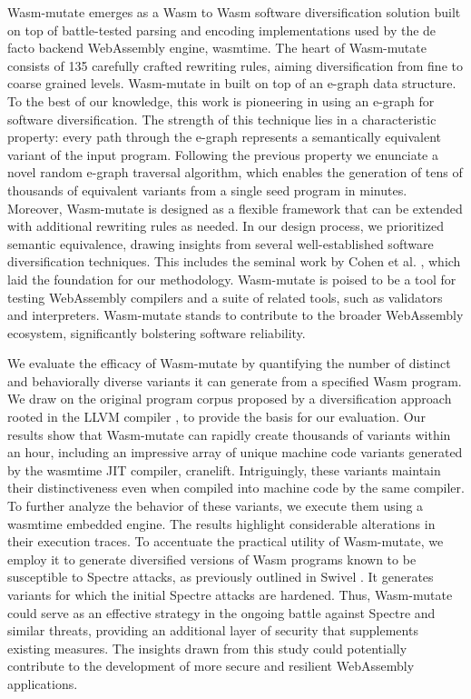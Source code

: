 \documentclass[sigplan,screen]{acmart}
\newcommand*\badge[1]{ \colorbox{red}{\color{white}#1}}
\newcommand{\tool}{Wasm-mutate\xspace}
\newcommand{\wasm}{Wasm\xspace}
\newcommand{\Wasm}{WebAssembly\xspace}
\newcommand{\todo}[1]{%
\refstepcounter{todo}
\noindent\textbf{\badge{TODO}} {\color{red}#1}
\addcontentsline{td}{todo}
{\color{red}\thesection.\thetodo\xspace #1}}
\begin{document}
\tool emerges as a \wasm to \wasm software diversification solution built on top of battle-tested parsing and encoding implementations used by the de facto backend \Wasm engine, wasmtime.
The heart of \tool consists of 135 carefully crafted rewriting rules, aiming diversification from fine to coarse grained levels. 
\tool in built on top of an e-graph data structure.
To the best of our knowledge, this work is pioneering in using an e-graph \cite{10.1145/3434304} for software diversification.
The strength of this technique lies in a characteristic property: every path through the e-graph represents a semantically equivalent variant of the input program. 
Following the previous property we enunciate a novel random e-graph traversal algorithm, which enables the generation of tens of thousands of equivalent variants from a single seed program in minutes.
Moreover, \tool is designed as a flexible framework that can be extended with additional rewriting rules as needed.
In our design process, we prioritized semantic equivalence, drawing insights from several well-established software diversification techniques. 
This includes the seminal work by Cohen et al. \cite{cohen1993operating}, which laid the foundation for our methodology.
\tool is poised to be a tool for testing \Wasm compilers and a suite of related tools, such as validators and interpreters. 
\tool stands to contribute to the broader \Wasm ecosystem, significantly bolstering software reliability. 


We evaluate the efficacy of \tool by quantifying the number of distinct and behaviorally diverse variants it can generate from a specified \wasm program. 
We draw on the original program corpus proposed by a diversification approach rooted in the LLVM compiler \cite{arteaga2020crow}, to provide the basis for our evaluation.
Our results show that \tool can rapidly create thousands of variants within an hour, including an impressive array of unique machine code variants generated by the wasmtime JIT compiler, cranelift. 
Intriguingly, these variants maintain their distinctiveness even when compiled into machine code by the same compiler.
To further analyze the behavior of these variants, we execute them using a wasmtime embedded engine. 
The results highlight considerable alterations in their execution traces.
To accentuate the practical utility of \tool, we employ it to generate diversified versions of \wasm programs known to be susceptible to Spectre attacks, as previously outlined in Swivel \cite{Swivel}. 
It generates variants for which the initial Spectre attacks are hardened.
Thus, \tool could serve as an effective strategy in the ongoing battle against Spectre and similar threats, providing an additional layer of security that supplements existing measures. 
The insights drawn from this study could potentially contribute to the development of more secure and resilient \Wasm applications.
\end{document}
